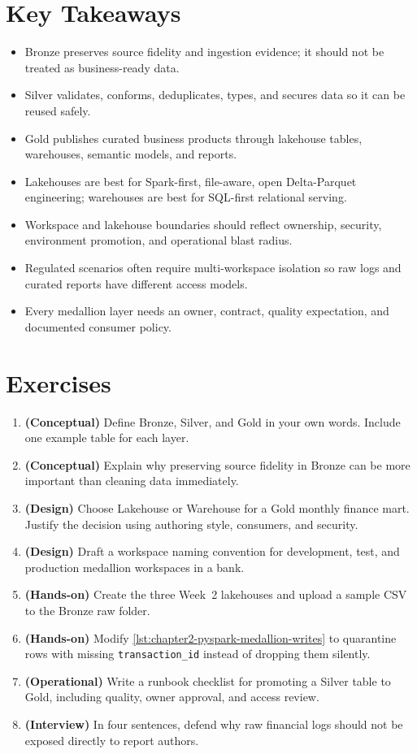 \section*{Key Takeaways}
\begin{itemize}
    \item Bronze preserves source fidelity and ingestion evidence; it should not be treated as business-ready data.
    \item Silver validates, conforms, deduplicates, types, and secures data so it can be reused safely.
    \item Gold publishes curated business products through lakehouse tables, warehouses, semantic models, and reports.
    \item Lakehouses are best for Spark-first, file-aware, open Delta-Parquet engineering; warehouses are best for SQL-first relational serving.
    \item Workspace and lakehouse boundaries should reflect ownership, security, environment promotion, and operational blast radius.
    \item Regulated scenarios often require multi-workspace isolation so raw logs and curated reports have different access models.
    \item Every medallion layer needs an owner, contract, quality expectation, and documented consumer policy.
\end{itemize}

\section{Exercises}
\begin{enumerate}
    \item \textbf{(Conceptual)} Define Bronze, Silver, and Gold in your own words. Include one example table for each layer.
    \item \textbf{(Conceptual)} Explain why preserving source fidelity in Bronze can be more important than cleaning data immediately.
    \item \textbf{(Design)} Choose Lakehouse or Warehouse for a Gold monthly finance mart. Justify the decision using authoring style, consumers, and security.
    \item \textbf{(Design)} Draft a workspace naming convention for development, test, and production medallion workspaces in a bank.
    \item \textbf{(Hands-on)} Create the three Week~2 lakehouses and upload a sample CSV to the Bronze raw folder.
    \item \textbf{(Hands-on)} Modify \cref{lst:chapter2-pyspark-medallion-writes} to quarantine rows with missing \texttt{transaction\_id} instead of dropping them silently.
    \item \textbf{(Operational)} Write a runbook checklist for promoting a Silver table to Gold, including quality, owner approval, and access review.
    \item \textbf{(Interview)} In four sentences, defend why raw financial logs should not be exposed directly to report authors.
\end{enumerate}

